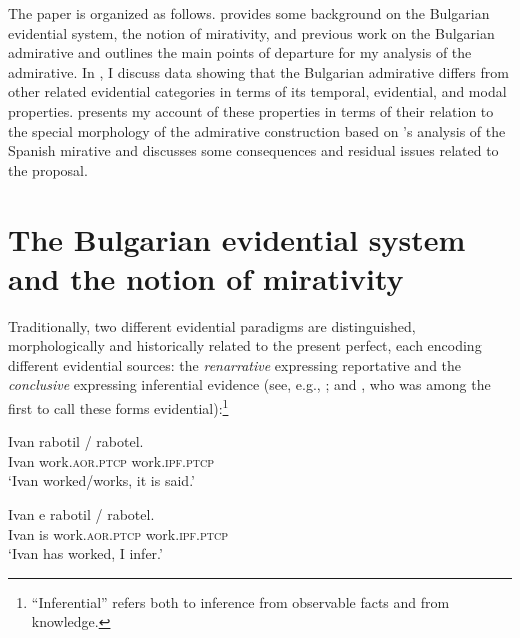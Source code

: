 \documentclass[output=paper,
colorlinks,
citecolor=brown,
newtxmath
]{langscibook}
\begin{document}
The paper is organized as follows.  provides some background on the Bulgarian evidential system, the notion of mirativity, and previous work on the Bulgarian admirative and outlines the main points of departure for my analysis of the admirative. In , I discuss data showing that the Bulgarian admirative differs from other related evidential categories in terms of its temporal, evidential, and modal properties.  presents my account of these properties in terms of their relation to the special morphology of the admirative construction based on \citeauthor{Bustamante2013}'s analysis of the Spanish mirative and  discusses some consequences and residual issues related to the proposal.




\section{The Bulgarian evidential system and the notion of mirativity}\label{sec:BG_evid_syst}

Traditionally, two different evidential paradigms are distinguished, morphologically and historically \citep[see][]{Andrejcin1944,Aronson1967}
related to the present perfect, each encoding different evidential sources: the \textit{renarrative} expressing reportative  and the \textit{conclusive} expressing inferential  evidence (see, e.g., \citealt{Bojadziev.etal1999,Pasov1999,Nicolova2008}; and \citealt{Jacobson1971}, who was among the first to call these forms evidential):\footnote{``Inferential'' refers both to inference from observable facts and from knowledge. %
}

\ea\label{report}
\gll Ivan rabotil / rabotel. \\
Ivan work.\textsc{aor.ptcp} {} work.\textsc{ipf.ptcp} \\
\glt `Ivan worked/works, it is said.'
\z

\ea \label{concl}
\gll Ivan e rabotil / rabotel. \\
 Ivan is work.\textsc{aor.ptcp} {} work.\textsc{ipf.ptcp}\\
\glt `Ivan has worked, I infer.'
\z
\end{document}
